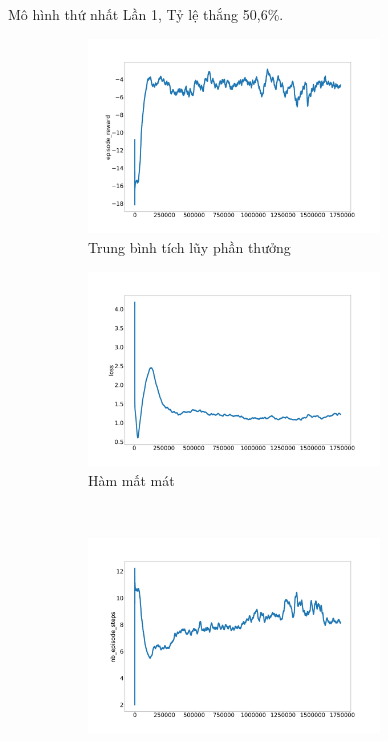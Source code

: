 \documentclass{beamer}
\begin{document}
\begin{frame}{Mô hình thứ nhất}
Lần 1, Tỷ lệ thắng 50,6\%.
\begin{figure}[ht]
    	\centering
    	\begin{subfigure}{.5\textwidth}
    		\includegraphics[width=0.85\textwidth]{Pic/First_model/episode_reward.png}
    		\caption{Trung bình tích lũy phần thưởng}
    		\label{fig:baseline_avg}
    	\end{subfigure}%
    	\begin{subfigure}{.5\textwidth}
    		\includegraphics[width=0.85\textwidth]{Pic/First_model/loss.png}
    		\caption{Hàm mất mát}
    		\label{fig:baseline_loss}
    	\end{subfigure}\\
    	\begin{subfigure}{.5\textwidth}
    		\includegraphics[width=0.85\textwidth]{Pic/First_model/nb_episode_steps.png}

\end{subfigure}
\end{figure}
\end{frame}
\end{document}
